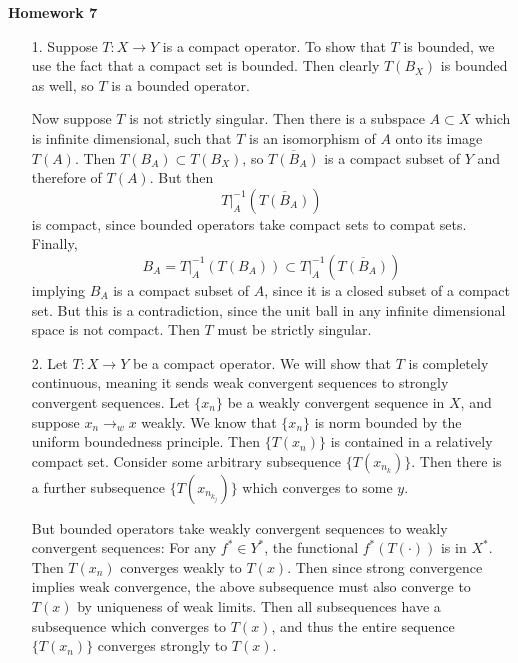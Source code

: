 \documentclass[11pt, reqno]{article}
\theoremstyle{plain}
\theoremstyle{definition}
\theoremstyle{remark}
\begin{document}
\topmargin=-40pt
\renewcommand{\headrulewidth}{1pt}
\renewcommand{\headsep}{20pt}
\thispagestyle{fancy}

{\Huge \bfseries \noindent Homework 7}

\begin{enumerate}
    \item[1.] Suppose $T: X \rightarrow Y$ is a compact operator. To show that $T$ is bounded, we use 
    the fact that a compact set is bounded. Then clearly $T(B_X)$ is bounded as well, so $T$ is a bounded operator.

    Now suppose $T$ is not strictly singular. Then there is a subspace $A \subset X$ which is infinite dimensional,
    such that $T$ is an isomorphism of $A$ onto its image $T(A)$. Then $T(B_A) \subset T(B_X)$, so $\overline{T(B_A)}$ is 
    a compact subset of $Y$ and therefore of $T(A)$. But then
    \[
        T\big|_{A}^{-1}(\overline{T(B_A)})
    \]
    is compact, since bounded operators take compact sets to compat sets. Finally, 
    \[
        B_A = T\big|_A^{-1}(T(B_A)) \subset T\big|_{A}^{-1}(\overline{T(B_A)})
    \]
    implying $B_A$ is a compact subset of $A$, since it is a closed subset of a compact set. But this is 
    a contradiction, since the unit ball in any infinite dimensional space is not compact. Then
    $T$ must be strictly singular. 

    \item[2.] Let $T: X \rightarrow Y$ be a compact operator. We will show that $T$ is completely continuous,
    meaning it sends weak convergent sequences to strongly convergent sequences. Let $\{x_n\}$ be a weakly convergent
    sequence in $X$, and suppose $x_n \rightarrow_w x$ weakly. We know that $\{x_n\}$ is norm bounded by the uniform boundedness
    principle. Then $\{T(x_n)\}$ is contained in a relatively compact set. Consider some arbitrary subsequence $\{T(x_{n_k})\}$.
    Then there is a further subsequence $\{T(x_{n_{k_j}})\}$ which converges to some $y$. 

    But bounded operators take weakly convergent sequences to weakly convergent sequences: For any $f^* \in Y^*$, the 
    functional $f^*(T(\cdot))$ is in $X^*$. Then $T(x_n)$ converges weakly to $T(x)$. Then since strong convergence implies 
    weak convergence, the above subsequence must also converge to $T(x)$ by uniqueness of weak limits. Then all subsequences 
    have a subsequence which converges to $T(x)$, and thus the entire sequence $\{T(x_n)\}$ converges strongly to $T(x)$. 


\end{enumerate}
\end{document}

